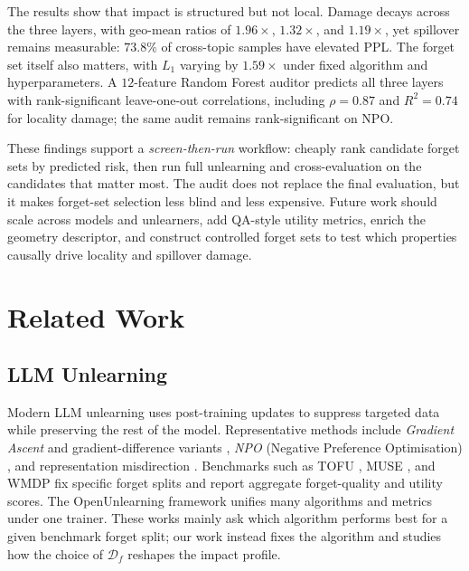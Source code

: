 \documentclass[11pt,a4paper]{article}
\newcommand{\Df}{\mathcal{D}_f}
\newcommand{\Lone}{L_1}
\begin{document}
The results show that impact is structured but not local. Damage decays across
the three layers, with geo-mean ratios of $1.96\times$, $1.32\times$, and
$1.19\times$, yet spillover remains measurable: $73.8\%$ of cross-topic
samples have elevated PPL. The forget set itself also matters, with $\Lone$
varying by $1.59\times$ under fixed algorithm and hyperparameters. A
$12$-feature Random Forest auditor predicts all three layers with
rank-significant leave-one-out correlations, including $\rho{=}0.87$ and
$R^2{=}0.74$ for locality damage; the same audit remains rank-significant on
NPO.

These findings support a \emph{screen-then-run} workflow: cheaply rank
candidate forget sets by predicted risk, then run full unlearning and
cross-evaluation on the candidates that matter most. The audit does not replace
the final evaluation, but it makes forget-set selection less blind and less
expensive. Future work should scale across models and unlearners, add QA-style
utility metrics, enrich the geometry descriptor, and construct controlled
forget sets to test which properties causally drive locality and spillover
damage.

\section{Related Work}
\label{sec:related}

\subsection{LLM Unlearning}
Modern LLM unlearning uses post-training updates to suppress targeted data
while preserving the rest of the model. Representative methods include
\emph{Gradient Ascent} and gradient-difference variants
\citep{jang2023knowledge}, \emph{NPO} (Negative Preference Optimisation)
\citep{zhang2024negative}, and representation misdirection
\citep{li2024wmdp}. Benchmarks such as TOFU \citep{maini2024tofu}, MUSE
\citep{shi2024muse}, and WMDP \citep{li2024wmdp} fix specific forget splits
and report aggregate forget-quality and utility scores. The OpenUnlearning
framework \citep{dorna2025openunlearning} unifies many algorithms and metrics
under one trainer. These works mainly ask which algorithm performs best for a
given benchmark forget split; our work instead fixes the algorithm and studies
how the choice of $\Df$ reshapes the impact profile.
\end{document}
